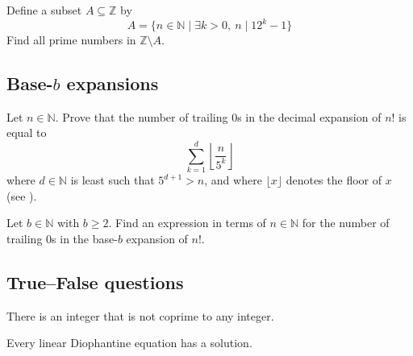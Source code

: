 \begin{chapex}
Define a subset $A \subseteq \mathbb{Z}$ by
\[ A = \{ n \in \mathbb{N} \mid \exists k > 0,~ n \mid 12^k-1 \} \]
Find all prime numbers in $\mathbb{Z} \setminus A$.
\end{chapex}

\subsection*{Base-$b$ expansions}

\begin{chapex}
Let $n \in \mathbb{N}$. Prove that the number of trailing $0$s in the decimal expansion of $n!$ is equal to
\[ \sum_{k=1}^d \left\lfloor \dfrac{n}{5^k} \right \rfloor \]
where $d \in \mathbb{N}$ is least such that $5^{d+1}>n$, and where $\lfloor x \rfloor$  denotes the floor of $x$ (see ).
\end{chapex}

\begin{chapex}
Let $b \in \mathbb{N}$ with $b \ge 2$. Find an expression in terms of $n \in \mathbb{N}$ for the number of trailing $0$s in the base-$b$ expansion of $n!$.
\end{chapex}

\subsection*{True--False questions}


\begin{chapex} %
\label{cqNumberTheoryTFBegin}
There is an integer that is not coprime to any integer.
\end{chapex}

\begin{chapex} %
Every linear Diophantine equation has a solution.
\end{chapex}

